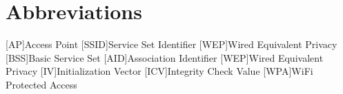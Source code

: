 \appendix
\renewcommand{\appendixtocname}{Appendix}
\renewcommand{\appendixpagename}{\appendixtocname}
\addappheadtotoc
{}
\appendixpage

\chapter{Abbreviations}

\begin{acronym}[\hspace{3cm}]
  [AP]{Access Point}
  [SSID]{Service Set Identifier}
  [WEP]{Wired Equivalent Privacy}
  [BSS]{Basic Service Set}
  [AID]{Association Identifier}
  [WEP]{Wired Equivalent Privacy}
  [IV]{Initialization Vector}
  [ICV]{Integrity Check Value}
  [WPA]{WiFi Protected Access}
\end{acronym}

\clearpage
\listoffigures
{}
